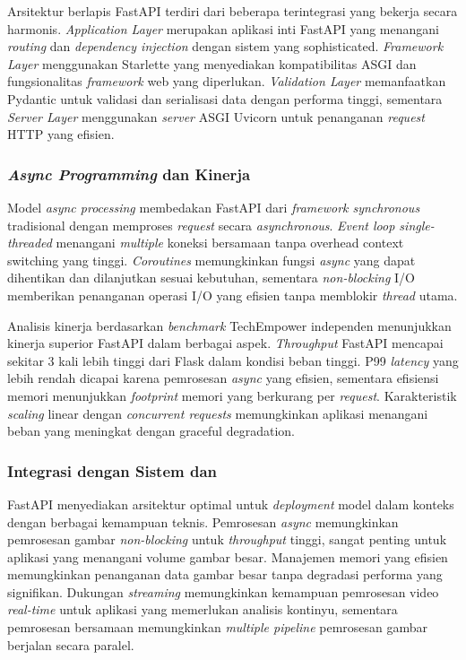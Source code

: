 Arsitektur berlapis FastAPI terdiri dari beberapa \layer terintegrasi yang bekerja secara harmonis. \emph{Application Layer} merupakan aplikasi inti FastAPI yang menangani \emph{routing} dan \emph{dependency injection} dengan sistem yang sophisticated. \emph{Framework Layer} menggunakan Starlette yang menyediakan kompatibilitas ASGI dan fungsionalitas \emph{framework} web yang diperlukan. \emph{Validation Layer} memanfaatkan Pydantic untuk validasi dan serialisasi data dengan performa tinggi, sementara \emph{Server Layer} menggunakan \emph{server} ASGI Uvicorn untuk penanganan \emph{request} HTTP yang efisien.

\subsubsection{\emph{Async Programming} dan Kinerja}

Model \emph{async processing} membedakan FastAPI dari \emph{framework synchronous} tradisional dengan memproses \emph{request} secara \emph{asynchronous}. \emph{Event loop single-threaded} menangani \emph{multiple} koneksi bersamaan tanpa overhead context switching yang tinggi. \emph{Coroutines} memungkinkan fungsi \emph{async} yang dapat dihentikan dan dilanjutkan sesuai kebutuhan, sementara \emph{non-blocking} I/O memberikan penanganan operasi I/O yang efisien tanpa memblokir \emph{thread} utama.

Analisis kinerja berdasarkan \emph{benchmark} TechEmpower independen menunjukkan kinerja superior FastAPI dalam berbagai aspek. \emph{Throughput} FastAPI mencapai sekitar 3 kali lebih tinggi dari Flask dalam kondisi beban tinggi. P99 \emph{latency} yang lebih rendah dicapai karena pemrosesan \emph{async} yang efisien, sementara efisiensi memori menunjukkan \emph{footprint} memori yang berkurang per \emph{request}. Karakteristik \emph{scaling} linear dengan \emph{concurrent requests} memungkinkan aplikasi menangani beban yang meningkat dengan graceful degradation.

\subsubsection{Integrasi dengan Sistem \cv dan \ml}

FastAPI menyediakan arsitektur optimal untuk \emph{deployment} model \ml dalam konteks \cv dengan berbagai kemampuan teknis. Pemrosesan \emph{async} memungkinkan pemrosesan gambar \emph{non-blocking} untuk \emph{throughput} tinggi, sangat penting untuk aplikasi yang menangani volume gambar besar. Manajemen memori yang efisien memungkinkan penanganan data gambar besar tanpa degradasi performa yang signifikan. Dukungan \emph{streaming} memungkinkan kemampuan pemrosesan video \emph{real-time} untuk aplikasi yang memerlukan analisis kontinyu, sementara pemrosesan bersamaan memungkinkan \emph{multiple pipeline} pemrosesan gambar berjalan secara paralel.

